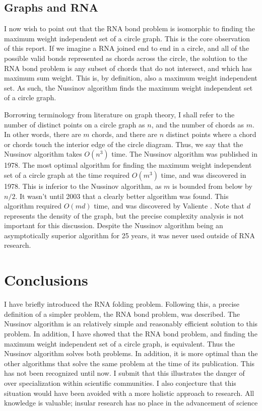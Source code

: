 \documentclass[12pt, a4paper]{article}
\begin{document}
\subsection{Graphs and RNA}
I now wish to point out that the RNA bond problem is isomorphic to finding the maximum weight independent set of a circle graph. This is the core observation of this report. If we imagine a RNA joined end to end in a circle, and all of the possible valid bonds represented as chords across the circle, the solution to the RNA bond problem is any subset of chords that do not intersect, and which has maximum sum weight. This is, by definition, also a maximum weight independent set. As such, the Nussinov algorithm finds the maximum weight independent set of a circle graph.

Borrowing terminology from literature on graph theory, I shall refer to the number of distinct points on a circle graph as $n$, and the number of chords as $m$. In other words, there are $m$ chords, and there are $n$ distinct points where a chord or chords touch the interior edge of the circle diagram. Thus, we say that the Nussinov algorithm takes $O(n^3)$ time. The Nussinov algorithm was published in 1978. The most optimal algorithm for finding the maximum weight independent set of a circle graph at the time required $O(m^3)$ time, and was discovered in 1978. This is inferior to the Nussinov algorithm, as $m$ is bounded from below by $n / 2$. It wasn't until 2003 that a clearly better algorithm was found. This algorithm required $O(md)$ time, and was discovered by Valiente \cite{valiente2003new}. Note that $d$ represents the density of the graph, but the precise complexity analysis is not important for this discussion. Despite the Nussinov algorithm being an asymptotically superior algorithm for 25 years, it was never used outside of RNA research.


\section{Conclusions}
I have briefly introduced the RNA folding problem. Following this, a precise definition of a simpler problem, the RNA bond problem, was described. The Nussinov algorithm is an relatively simple and reasonably efficient solution to this problem. In addition, I have showed that the RNA bond problem, and finding the maximum weight independent set of a circle graph, is equivalent. Thus the Nussinov algorithm solves both problems. In addition, it is more optimal than the other algorithms that solve the same problem at the time of its publication. This has not been recognized until now. I submit that this illustrates the danger of over specialization within scientific communities. I also conjecture that this situation would have been avoided with a more holistic approach to research. All
knowledge is valuable; insular research has no place in the advancement of science




\end{document}
